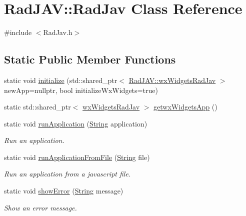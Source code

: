 \hypertarget{class_rad_j_a_v_1_1_rad_jav}{}\section{Rad\+J\+AV\+:\+:Rad\+Jav Class Reference}
\label{class_rad_j_a_v_1_1_rad_jav}


{\ttfamily \#include $<$Rad\+Jav.\+h$>$}

\subsection*{Static Public Member Functions}
\begin{DoxyCompactItemize}
\item 
static void \hyperlink{class_rad_j_a_v_1_1_rad_jav_a83b5c34f4d2a7b86e12b8f15e8c80b16}{initialize} (std\+::shared\+\_\+ptr$<$ \hyperlink{class_rad_j_a_v_1_1wx_widgets_rad_jav}{Rad\+J\+A\+V\+::wx\+Widgets\+Rad\+Jav} $>$ new\+App=nullptr, bool initialize\+Wx\+Widgets=true)
\item 
static std\+::shared\+\_\+ptr$<$ \hyperlink{class_rad_j_a_v_1_1wx_widgets_rad_jav}{wx\+Widgets\+Rad\+Jav} $>$ \hyperlink{class_rad_j_a_v_1_1_rad_jav_a50e810b811cade7c92db089ba8a9aa52}{getwx\+Widgets\+App} ()
\item 
static void \hyperlink{class_rad_j_a_v_1_1_rad_jav_aca464dc91001ac224b55b1ecd85f37a3}{run\+Application} (\hyperlink{class_rad_j_a_v_1_1_string}{String} application)
\begin{DoxyCompactList}\small\item\em Run an application. \end{DoxyCompactList}\item 
static void \hyperlink{class_rad_j_a_v_1_1_rad_jav_a293b050fb802c1d1c1112895388c9c7c}{run\+Application\+From\+File} (\hyperlink{class_rad_j_a_v_1_1_string}{String} file)
\begin{DoxyCompactList}\small\item\em Run an application from a javascript file. \end{DoxyCompactList}\item 
static void \hyperlink{class_rad_j_a_v_1_1_rad_jav_a31c78e173cd6497c8499d194f36966e0}{show\+Error} (\hyperlink{class_rad_j_a_v_1_1_string}{String} message)
\begin{DoxyCompactList}\small\item\em Show an error message. \end{DoxyCompactList}\end{DoxyCompactItemize}
